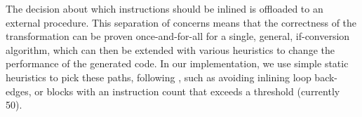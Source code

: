 \noindent
The decision about which  instructions should be inlined is offloaded
to an external procedure.
This separation of concerns means that the correctness of the transformation can
be proven once-and-for-all for a single, general, if-conversion algorithm, which
can then be extended with various heuristics to change the performance of the
generated code.  In our implementation, we use simple static heuristics to pick
these paths, following \textcite{ball93_branc_predic_free}, such as avoiding
inlining loop back-edges, or blocks with an instruction count that exceeds a
threshold (currently
50). %






%

